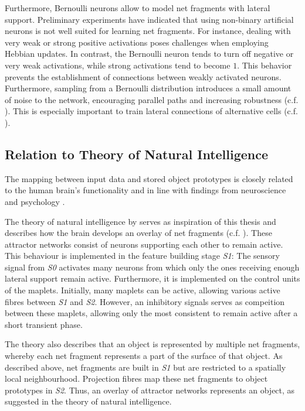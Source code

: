 Furthermore,  Bernoulli neurons allow to model net fragments with lateral support. Preliminary experiments have indicated that using non-binary artificial neurons is not well suited for learning net fragments. For instance, dealing with very weak or strong positive activations poses challenges when employing Hebbian updates. In contrast, the Bernoulli neuron tends to turn off negative or very weak activations, while strong activations tend to become $1$. This behavior prevents the establishment of connections between weakly activated neurons. Furthermore, sampling from a Bernoulli distribution introduces a small amount of noise to the network, encouraging parallel paths and increasing robustness (c.f. ). This is especially important to train lateral connections of alternative cells (c.f. ).


\subsection{Relation to Theory of Natural Intelligence}
The mapping between input data and stored object prototypes is closely related to the human brain's functionality and in line with findings from neuroscience \cite{kandel_principles_2013, olshausen_emergence_1996, vogels_inhibitory_2011, payeur_burst-dependent_2021} and psychology \cite{ellis_source_1938, kohler_gestalt_1992, wagemans_century_2012, hamlyn_psychology_2017}.

The theory of natural intelligence by  serves as inspiration of this thesis and describes how the brain develops an overlay of net fragments (c.f. ). These attractor networks consist of neurons supporting each other to remain active.
This behaviour is implemented in the feature building stage \emph{S1}: The sensory signal from \emph{S0} activates many neurons from which only the ones receiving enough lateral support remain active. Furthermore, it is implemented on the control units of the maplets. Initially, many maplets can be active, allowing various active fibres between \emph{S1} and \emph{S2}. However, an inhibitory signals serves as compeition between these maplets, allowing only the most consistent to remain active after a short transient phase.

The theory also describes that an object is represented by multiple net fragments, whereby each net fragment represents a part of the surface of that object.
As described above, net fragments are built in \emph{S1} but are restricted to a spatially local neighbourhood. Projection fibres map these net fragments to object prototypes in \emph{S2}. Thus, an overlay of attractor networks represents an object, as suggested in the theory of natural intelligence.

